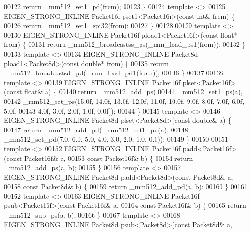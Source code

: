 \begin{DoxyCode}
00122   \textcolor{keywordflow}{return} \_mm512\_set1\_pd(from);
00123 \}
00124 \textcolor{keyword}{template} <>
00125 EIGEN\_STRONG\_INLINE Packet16i pset1<Packet16i>(\textcolor{keyword}{const} \textcolor{keywordtype}{int}& from) \{
00126   \textcolor{keywordflow}{return} \_mm512\_set1\_epi32(from);
00127 \}
00128 
00129 \textcolor{keyword}{template} <>
00130 EIGEN\_STRONG\_INLINE Packet16f pload1<Packet16f>(\textcolor{keyword}{const} \textcolor{keywordtype}{float}* from) \{
00131   \textcolor{keywordflow}{return} \_mm512\_broadcastss\_ps(\_mm\_load\_ps1(from));
00132 \}
00133 \textcolor{keyword}{template} <>
00134 EIGEN\_STRONG\_INLINE Packet8d pload1<Packet8d>(\textcolor{keyword}{const} \textcolor{keywordtype}{double}* from) \{
00135   \textcolor{keywordflow}{return} \_mm512\_broadcastsd\_pd(\_mm\_load\_pd1(from));
00136 \}
00137 
00138 \textcolor{keyword}{template} <>
00139 EIGEN\_STRONG\_INLINE Packet16f plset<Packet16f>(\textcolor{keyword}{const} \textcolor{keywordtype}{float}& a) \{
00140   \textcolor{keywordflow}{return} \_mm512\_add\_ps(
00141       \_mm512\_set1\_ps(a),
00142       \_mm512\_set\_ps(15.0f, 14.0f, 13.0f, 12.0f, 11.0f, 10.0f, 9.0f, 8.0f, 7.0f, 6.0f, 5.0f,
00143                     4.0f, 3.0f, 2.0f, 1.0f, 0.0f));
00144 \}
00145 \textcolor{keyword}{template} <>
00146 EIGEN\_STRONG\_INLINE Packet8d plset<Packet8d>(\textcolor{keyword}{const} \textcolor{keywordtype}{double}& a) \{
00147   \textcolor{keywordflow}{return} \_mm512\_add\_pd(\_mm512\_set1\_pd(a),
00148                        \_mm512\_set\_pd(7.0, 6.0, 5.0, 4.0, 3.0, 2.0, 1.0, 0.0));
00149 \}
00150 
00151 \textcolor{keyword}{template} <>
00152 EIGEN\_STRONG\_INLINE Packet16f padd<Packet16f>(\textcolor{keyword}{const} Packet16f& a,
00153                                               \textcolor{keyword}{const} Packet16f& b) \{
00154   \textcolor{keywordflow}{return} \_mm512\_add\_ps(a, b);
00155 \}
00156 \textcolor{keyword}{template} <>
00157 EIGEN\_STRONG\_INLINE Packet8d padd<Packet8d>(\textcolor{keyword}{const} Packet8d& a,
00158                                             \textcolor{keyword}{const} Packet8d& b) \{
00159   \textcolor{keywordflow}{return} \_mm512\_add\_pd(a, b);
00160 \}
00161 
00162 \textcolor{keyword}{template} <>
00163 EIGEN\_STRONG\_INLINE Packet16f psub<Packet16f>(\textcolor{keyword}{const} Packet16f& a,
00164                                               \textcolor{keyword}{const} Packet16f& b) \{
00165   \textcolor{keywordflow}{return} \_mm512\_sub\_ps(a, b);
00166 \}
00167 \textcolor{keyword}{template} <>
00168 EIGEN\_STRONG\_INLINE Packet8d psub<Packet8d>(\textcolor{keyword}{const} Packet8d& a,

\end{DoxyCode}
